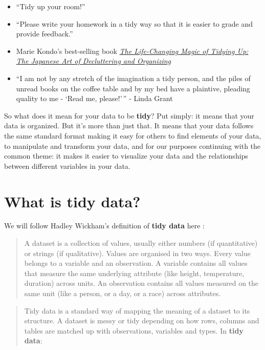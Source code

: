 \documentclass[]{tufte-book}
\providecommand{\tightlist}{%
  \setlength{\itemsep}{0pt}\setlength{\parskip}{0pt}}
\begin{document}
\begin{itemize}
\tightlist
\item
  ``Tidy up your room!''
\item
  ``Please write your homework in a tidy way so that it is easier to
  grade and provide feedback.''
\item
  Marie Kondo's best-selling book
  \href{https://www.amazon.com/Life-Changing-Magic-Tidying-Decluttering-Organizing/dp/1607747308/ref=sr_1_1?ie=UTF8\&qid=1469400636\&sr=8-1\&keywords=tidying+up}{\emph{The
  Life-Changing Magic of Tidying Up: The Japanese Art of Decluttering
  and Organizing}}
\item
  ``I am not by any stretch of the imagination a tidy person, and the
  piles of unread books on the coffee table and by my bed have a
  plaintive, pleading quality to me - `Read me, please!'\,'' - Linda
  Grant
\end{itemize}

So what does it mean for your data to be \textbf{tidy}? Put simply: it
means that your data is organized. But it's more than just that. It
means that your data follows the same standard format making it easy for
others to find elements of your data, to manipulate and transform your
data, and for our purposes continuing with the common theme: it makes it
easier to visualize your data and the relationships between different
variables in your data.

\section{What is tidy data?}\label{what-is-tidy-data}

We will follow Hadley Wickham's definition of \textbf{tidy data} here
\citep{tidy}:

\begin{quote}
A dataset is a collection of values, usually either numbers (if
quantitative) or strings (if qualitative). Values are organised in two
ways. Every value belongs to a variable and an observation. A variable
contains all values that measure the same underlying attribute (like
height, temperature, duration) across units. An observation contains all
values measured on the same unit (like a person, or a day, or a race)
across attributes.
\end{quote}

\begin{quote}
Tidy data is a standard way of mapping the meaning of a dataset to its
structure. A dataset is messy or tidy depending on how rows, columns and
tables are matched up with observations, variables and types. In
\textbf{tidy data}:
\end{quote}
\end{document}
